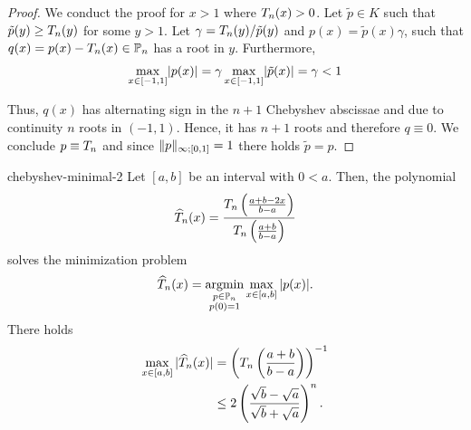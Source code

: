 \begin{proof}
  We conduct the proof for $x>1$ where $T_n(x) > 0$.
  Let $\tilde p\in K$ such that
  $\tilde p(y) \ge T_n(y)$ for some $y>1$. Let
  $\gamma = T_n(y)/\tilde p(y)$ and
  $p(x) = \tilde p(x)\gamma$, such that
  $q(x) = p(x) - T_n(x) \in \mathbb P_n$ has a root in $y$.
  Furthermore,
  \begin{gather}
    \max_{x\in[-1,1]} \lvert p(x)\rvert = \gamma\max_{x\in[-1,1]} \lvert\tilde p(x)\rvert = \gamma < 1
  \end{gather}

  Thus, $q(x)$ has alternating sign in the $n+1$ Chebyshev abscissae and due to continuity $n$ roots in
  $(-1,1)$. Hence, it has $n+1$ roots and therefore
  $q \equiv 0$. We conclude $p \equiv T_n$ and since
  $\lVert p\rVert_{\infty;[0,1]} = 1$ there holds $\tilde p = p$.
\end{proof}

\begin{Corollary}{chebyshev-minimal-2}
  Let $[a,b]$ be an interval with $0 < a$. Then, the polynomial
  \begin{gather}
    \widehat \pchebyshev_n(x)
    = \frac{\pchebyshev_n\left(\frac{a+b-2x}{b-a}\right)}%
    {\pchebyshev_n\left(\frac{a+b}{b-a}\right)}
  \end{gather}
  solves the minimization problem
  \begin{gather}
    \widehat {T}_n(x)
    = \operatorname*{argmin}_{\substack{p\in\mathbb P_n\\p(0) = 1}}
    \max_{x\in[a,b]}{\lvert p(x)\rvert}.
  \end{gather}
  There holds
  \begin{align}
    \label{eq:chebyshev-cg1}
    \max_{x\in[a,b]}{\lvert\widehat {T}_n(x)\rvert}
    &= \left(T_n\left(\frac{a+b}{b-a}\right)\right)^{-1}\\
    & \le 2 \left(\frac{\sqrt b-\sqrt a}{\sqrt b + \sqrt a}\right)^n.
  \end{align}
\end{Corollary}

